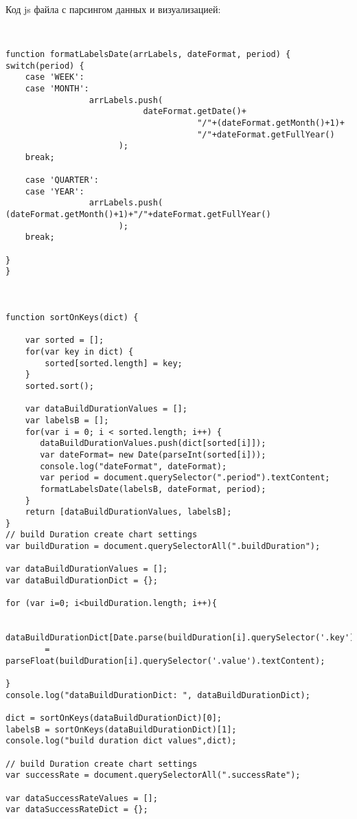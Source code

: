Код js файла с парсингом данных и визуализацией:

\begin{lstlisting}


function formatLabelsDate(arrLabels, dateFormat, period) {
switch(period) {
    case 'WEEK':
    case 'MONTH':
                 arrLabels.push(
                            dateFormat.getDate()+
                                       "/"+(dateFormat.getMonth()+1)+
                                       "/"+dateFormat.getFullYear()
                       );
    break;

    case 'QUARTER':
    case 'YEAR':
                 arrLabels.push(
(dateFormat.getMonth()+1)+"/"+dateFormat.getFullYear()
                       );
    break;

}
}



function sortOnKeys(dict) {

    var sorted = [];
    for(var key in dict) {
        sorted[sorted.length] = key;
    }
    sorted.sort();

    var dataBuildDurationValues = [];
    var labelsB = [];
    for(var i = 0; i < sorted.length; i++) {
       dataBuildDurationValues.push(dict[sorted[i]]);
       var dateFormat= new Date(parseInt(sorted[i]));
       console.log("dateFormat", dateFormat);
       var period = document.querySelector(".period").textContent;
       formatLabelsDate(labelsB, dateFormat, period);
    }
    return [dataBuildDurationValues, labelsB];
}
// build Duration create chart settings
var buildDuration = document.querySelectorAll(".buildDuration");

var dataBuildDurationValues = [];
var dataBuildDurationDict = {};

for (var i=0; i<buildDuration.length; i++){

    dataBuildDurationDict[Date.parse(buildDuration[i].querySelector('.key').textContent)]
        = parseFloat(buildDuration[i].querySelector('.value').textContent);

}
console.log("dataBuildDurationDict: ", dataBuildDurationDict);

dict = sortOnKeys(dataBuildDurationDict)[0];
labelsB = sortOnKeys(dataBuildDurationDict)[1];
console.log("build duration dict values",dict);

// build Duration create chart settings
var successRate = document.querySelectorAll(".successRate");

var dataSuccessRateValues = [];
var dataSuccessRateDict = {};


\end{lstlisting}
